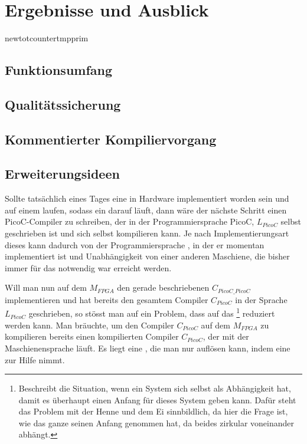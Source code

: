 \chapter{Ergebnisse und Ausblick}
\label{ch:ergebnisse_und_ausblick}


newtotcounter{tmpprim}

\section{Funktionsumfang}
\section{Qualitätssicherung}
\label{sec:qualitätssicherung}
\section{Kommentierter Kompiliervorgang}
\section{Erweiterungsideen}
Sollte tatsächlich eines Tages eine  in Hardware implementiert worden sein und auf einem  laufen, sodass ein  darauf läuft, dann wäre der nächste Schritt einen PicoC-Compiler zu schreiben, der in der Programmiersprache PicoC, $L_{PicoC}$ selbst geschrieben ist und sich selbst kompilieren kann. Je nach Implementierungsart dieses  kann dadurch  von der Programmiersprache , in der er momentan implementiert ist und Unabhängigkeit von einer anderen Maschiene, die bisher immer für das  notwendig war erreicht werden.

Will man nun auf dem  $M_{FPGA}$ den gerade beschriebenen  $C_{PicoC\_PicoC}$ implementieren und hat bereits den gesamtem Compiler $C_{PicoC}$ in der Sprache  $L_{PicoC}$ geschrieben, so stösst man auf ein Problem, dass auf das \footnote{Beschreibt die Situation, wenn ein System sich selbst als Abhängigkeit hat, damit es überhaupt einen Anfang für dieses System geben kann. Dafür steht das Problem mit der Henne und dem Ei sinnbildlich, da hier die Frage ist, wie das ganze seinen Anfang genommen hat, da beides zirkular voneinander abhängt.} reduziert werden kann. Man bräuchte, um den Compiler $C_{PicoC}$ auf dem  $M_{FPGA}$ zu kompilieren bereits einen kompilierten Compiler $C_{PicoC}$, der mit der Maschienensprache  läuft. Es liegt eine , die man nur auflösen kann, indem eine  zur Hilfe nimmt.

